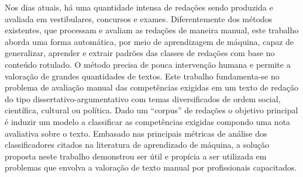 \begin{resumo} 
  Nos dias atuais, há uma quantidade intensa de redações sendo produzida e 
  avaliada em vestibulares, concursos e exames. Diferentemente dos métodos 
  existentes, que processam e avaliam as redações de maneira manual, este 
  trabalho aborda uma forma automática, por meio de  aprendizagem de máquina, 
  capaz de generalizar, aprender e extrair padrões das classes de redações com 
  base no conteúdo rotulado. O método precisa de pouca intervenção humana e 
  permite a valoração de grandes quantidades de textos.  Este trabalho 
  fundamenta-se no problema de avaliação manual das competências exigidas em um 
  texto de redação do tipo dissertativo-argumentativo com temas diversificados 
  de ordem social, científica, cultural ou política. Dado um ``corpus'' de 
  redações o objetivo principal é induzir um modelo a classificar as 
  competências exigidas compondo uma nota avaliativa sobre o texto. Embasado 
  nas principais métricas de análise dos classificadores citados na literatura 
  de aprendizado de máquina, a solução proposta neste trabalho demonstrou ser 
  útil e propícia a ser utilizada em problemas que envolva a valoração de texto 
  manual por profissionais capacitados.
\end{resumo}